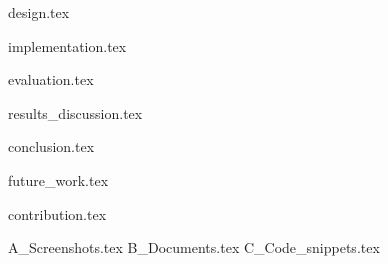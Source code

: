 \documentclass[11pt,a4paper]{report}
\numberwithin{figure}{section}
\numberwithin{table}{section}
\begin{document}
{design.tex}
\clearpage

{implementation.tex}
\clearpage

{evaluation.tex}
\clearpage

{results_discussion.tex}
\clearpage

{conclusion.tex}
\clearpage

{future_work.tex}
\clearpage

{contribution.tex}
\clearpage

\appendix
{A_Screenshots.tex}
{B_Documents.tex}
{C_Code_snippets.tex}
\clearpage



\thispagestyle{empty}
\clearpage
\end{document}
